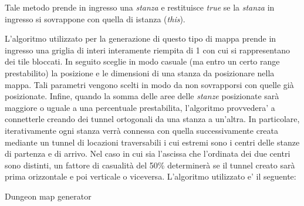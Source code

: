 \documentclass[11pt]{book}
\begin{document}
\par{Tale metodo prende in ingresso una \emph{stanza} e restituisce \emph{true} se la \emph{stanza} in ingresso si sovrappone con quella di istanza (\emph{this}).\fi
 \par{L'algoritmo utilizzato per la generazione di questo tipo di mappa prende in ingresso una griglia di interi interamente riempita di 1 con cui si rappresentano dei tile bloccati. In seguito sceglie in modo casuale (ma entro un certo range prestabilito) la posizione e le dimensioni di una stanza da posizionare nella mappa. Tali parametri vengono scelti in modo da non sovrapporsi con quelle gi\`a posizionate. Infine, quando la somma delle aree delle \emph{stanze} posizionate sar\`a maggiore o uguale a una percentuale prestabilita, l'algoritmo provvedera' a connetterle creando dei tunnel ortogonali da una stanza a un'altra. In particolare, iterativamente ogni stanza verr\`a connessa con quella successivamente creata mediante un tunnel di locazioni traversabili i cui estremi sono i centri delle stanze di partenza e di arrivo.  Nel caso in cui sia l'ascissa che l'ordinata dei due centri sono distinti, un fattore di casualit\`a del 50\% determiner\`a se il tunnel creato sar\`a prima orizzontale e poi verticale o viceversa.} L'algoritmo utilizzato e' il seguente:\par

\begin{algorithm}[H]
\PrintSemicolon
\caption{Dungeon map generator}
\newcommand{\forcond}{$i=0$ \KwTo $n$}

\end{algorithm}}
\end{document}
